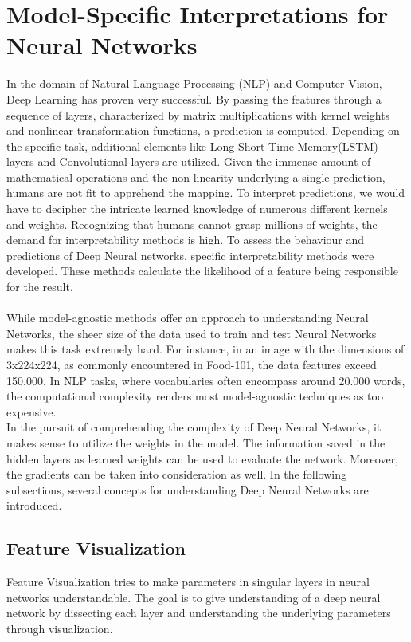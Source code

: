 \section{Model-Specific Interpretations for Neural Networks}
\label{sec:nni}
In the domain of Natural Language Processing (NLP) and Computer Vision, Deep Learning has proven very successful. By passing the features through a sequence of layers, characterized by matrix multiplications with kernel weights and nonlinear transformation functions, a prediction is computed. Depending on the specific task, additional elements like Long Short-Time Memory(LSTM) layers and Convolutional layers are utilized. Given the immense amount of mathematical operations and the non-linearity underlying a single prediction, humans are not fit to apprehend the mapping. To interpret predictions, we would have to decipher the intricate learned knowledge of numerous different kernels and weights.
Recognizing that humans cannot grasp millions of weights, the demand for interpretability methods is high. To assess the behaviour and predictions of Deep Neural networks, specific interpretability methods were developed. These methods calculate the likelihood of a feature being responsible for the result.
\\\\
While model-agnostic methods offer an approach to understanding Neural Networks, the sheer size of the data used to train and test Neural Networks makes this task extremely hard. For instance, in an image with the dimensions of 3x224x224, as commonly encountered in Food-101, the data features exceed 150.000. In NLP tasks, where vocabularies often encompass around 20.000 words, the computational complexity renders most model-agnostic techniques as too expensive.
\\
In the pursuit of comprehending the complexity of Deep Neural Networks, it makes sense to utilize the weights in the model. The information saved in the hidden layers as learned weights can be used to evaluate the network. Moreover, the gradients can be taken into consideration as well.
In the following subsections, several concepts for understanding Deep Neural Networks are introduced. 


\subsection{Feature Visualization}
\label{sec:network_dissection}

Feature Visualization tries to make parameters in singular layers in neural networks understandable. The goal is to give understanding of a deep neural network by dissecting each layer and understanding the underlying parameters through visualization.

